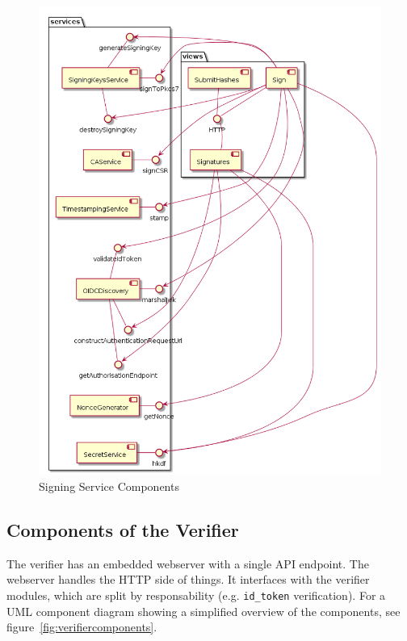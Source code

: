 \begin{figure}
    \begin{center}
        \includegraphics[width=0.7\linewidth]{images/signing_service_components.png}
        \caption{Signing Service Components}
        \label{fig:signingservicecomponents}
    \end{center}
\end{figure}


\subsection{Components of the Verifier}\label{subsec:modules-of-the-verifier}
The verifier has an embedded webserver with a single \gls{API} endpoint.
The webserver handles the \gls{HTTP} side of things.
It interfaces with the verifier modules, which are split by responsability (e.g. \texttt{id\_token} verification).
For a \gls{UML} component diagram showing a simplified overview of the components, see figure~\ref{fig:verifiercomponents}.

